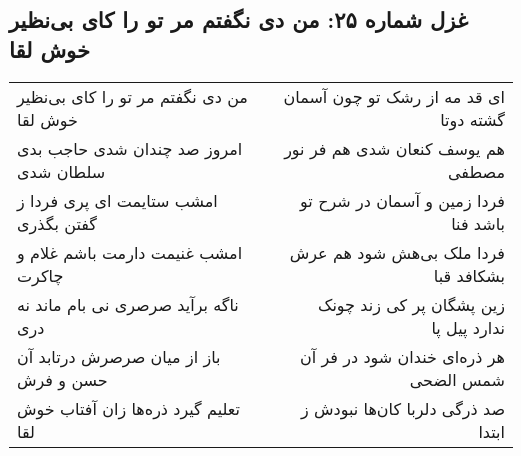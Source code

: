 \begin{center}
\section*{غزل شماره ۲۵: من دی نگفتم مر تو را کای بی‌نظیر خوش لقا}
\label{sec:0025}
\begin{longtable}{l p{0.5cm} r}
من دی نگفتم مر تو را کای بی‌نظیر خوش لقا
&&
ای قد مه از رشک تو چون آسمان گشته دوتا
\\
امروز صد چندان شدی حاجب بدی سلطان شدی
&&
هم یوسف کنعان شدی هم فر نور مصطفی
\\
امشب ستایمت ای پری فردا ز گفتن بگذری
&&
فردا زمین و آسمان در شرح تو باشد فنا
\\
امشب غنیمت دارمت باشم غلام و چاکرت
&&
فردا ملک بی‌هش شود هم عرش بشکافد قبا
\\
ناگه برآید صرصری نی بام ماند نه دری
&&
زین پشگان پر کی زند چونک ندارد پیل پا
\\
باز از میان صرصرش درتابد آن حسن و فرش
&&
هر ذره‌ای خندان شود در فر آن شمس الضحی
\\
تعلیم گیرد ذره‌ها زان آفتاب خوش لقا
&&
صد ذرگی دلربا کان‌ها نبودش ز ابتدا
\\
\end{longtable}
\end{center}
